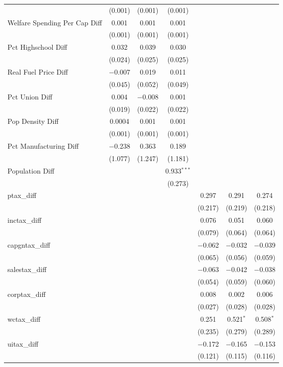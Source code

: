 \begin{table}[!htbp]
\begin{tabular}{@{\extracolsep{5pt}}lcccccc}
  & (0.001) & (0.001) & (0.001) &  &  &  \\ 
  Welfare Spending Per Cap Diff & 0.001 & 0.001 & 0.001 &  &  &  \\ 
  & (0.001) & (0.001) & (0.001) &  &  &  \\ 
  Pct Highschool Diff & 0.032 & 0.039 & 0.030 &  &  &  \\ 
  & (0.024) & (0.025) & (0.025) &  &  &  \\ 
  Real Fuel Price Diff & $-$0.007 & 0.019 & 0.011 &  &  &  \\ 
  & (0.045) & (0.052) & (0.049) &  &  &  \\ 
  Pct Union Diff & 0.004 & $-$0.008 & 0.001 &  &  &  \\ 
  & (0.019) & (0.022) & (0.022) &  &  &  \\ 
  Pop Density Diff & 0.0004 & 0.001 & 0.001 &  &  &  \\ 
  & (0.001) & (0.001) & (0.001) &  &  &  \\ 
  Pct Manufacturing Diff & $-$0.238 & 0.363 & 0.189 &  &  &  \\ 
  & (1.077) & (1.247) & (1.181) &  &  &  \\ 
  Population Diff &  &  & 0.933$^{***}$ &  &  &  \\ 
  &  &  & (0.273) &  &  &  \\ 
  ptax\_diff &  &  &  & 0.297 & 0.291 & 0.274 \\ 
  &  &  &  & (0.217) & (0.219) & (0.218) \\ 
  inctax\_diff &  &  &  & 0.076 & 0.051 & 0.060 \\ 
  &  &  &  & (0.079) & (0.064) & (0.064) \\ 
  capgntax\_diff &  &  &  & $-$0.062 & $-$0.032 & $-$0.039 \\ 
  &  &  &  & (0.065) & (0.056) & (0.059) \\ 
  salestax\_diff &  &  &  & $-$0.063 & $-$0.042 & $-$0.038 \\ 
  &  &  &  & (0.054) & (0.059) & (0.060) \\ 
  corptax\_diff &  &  &  & 0.008 & 0.002 & 0.006 \\ 
  &  &  &  & (0.027) & (0.028) & (0.028) \\ 
  wctax\_diff &  &  &  & 0.251 & 0.521$^{*}$ & 0.508$^{*}$ \\ 
  &  &  &  & (0.235) & (0.279) & (0.289) \\ 
  uitax\_diff &  &  &  & $-$0.172 & $-$0.165 & $-$0.153 \\ 
  &  &  &  & (0.121) & (0.115) & (0.116) \\ 

\end{tabular}
\end{table}
